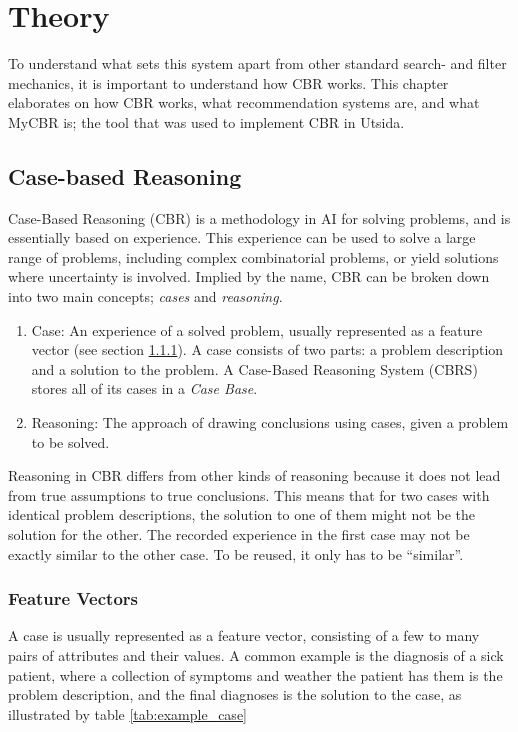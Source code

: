 \cleardoublepage

\chapter{Theory}

To understand what sets this system apart from other standard search- and filter mechanics, it is important to understand how CBR works. This chapter elaborates on how CBR works, what recommendation systems are, and what MyCBR is; the tool that was used to implement CBR in Utsida.


\section{Case-based Reasoning}
Case-Based Reasoning (CBR) is a methodology in AI for solving problems, and is essentially based on experience. This experience can be used to solve a large range of problems, including complex combinatorial problems, or yield solutions where uncertainty is involved. \cite{richter2013case} Implied by the name, CBR can be broken down into two main concepts; \textit{cases} and \textit{reasoning}.

\begin{enumerate}
    \item Case: An experience of a solved problem, usually represented as a feature vector (see section \ref{sec:feature_vectors}). A case consists of two parts: a problem description and a solution to the problem. A Case-Based Reasoning System (CBRS) stores all of its cases in a \textit{Case Base}.
    \item Reasoning: The approach of drawing conclusions using cases, given a problem to be solved.
\end{enumerate}

Reasoning in CBR differs from other kinds of reasoning because it does not lead from true assumptions to true conclusions. This means that for two cases with identical problem descriptions, the solution to one of them might not be the solution for the other. The recorded experience in the first case may not be exactly similar to the other case. To be reused, it only has to be \enquote{similar}.

\subsection{Feature Vectors}\label{sec:feature_vectors}
A case is usually represented as a feature vector, consisting of a few to many pairs of attributes and their values. A common example is the diagnosis of a sick patient, where a collection of symptoms and weather the patient has them is the problem description, and the final diagnoses is the solution to the case, as illustrated by table \ref{tab:example_case}



